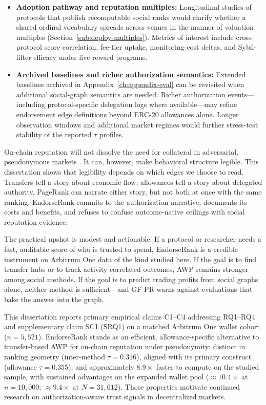 \begin{itemize}
\item \textbf{Adoption pathway and reputation multiples:} Longitudinal studies of protocols that publish recomputable social ranks would clarify whether a shared ordinal vocabulary spreads across venues in the manner of valuation multiples (Section~\ref{sub:deploy-multiples}). Metrics of interest include cross-protocol score correlation, fee-tier uptake, monitoring-cost deltas, and Sybil-filter efficacy under live reward programs.

\item \textbf{Archived baselines and richer authorization semantics:} Extended baselines archived in Appendix~\ref{ch:appendix-eval} can be revisited when additional social-graph semantics are needed. Richer authorization events---including protocol-specific delegation logs where available---may refine endorsement edge definitions beyond ERC-20 allowances alone. Longer observation windows and additional market regimes would further stress-test stability of the reported $\tau$ profiles.
\end{itemize}


On-chain reputation will not dissolve the need for collateral in adversarial, pseudonymous markets . It can, however, make behavioral structure legible. This dissertation shows that legibility depends on which edges we choose to read. Transfers tell a story about economic flow; allowances tell a story about delegated authority. PageRank can narrate either story, but not both at once with the same ranking. EndorseRank commits to the authorization narrative, documents its costs and benefits, and refuses to confuse outcome-native ceilings with social reputation evidence.

The practical upshot is modest and actionable. If a protocol or researcher needs a fast, auditable score of who is trusted to spend, EndorseRank is a credible instrument on Arbitrum One data of the kind studied here. If the goal is to find transfer hubs or to track activity-correlated outcomes, AWP remains stronger among social methods. If the goal is to predict trading profits from social graphs alone, neither method is sufficient---and GF-PR warns against evaluations that bake the answer into the graph.

This dissertation reports primary empirical claims C1--C4 addressing RQ1--RQ4 and supplementary claim SC1 (SRQ1) on a matched Arbitrum One wallet cohort ($n=5{,}521$). EndorseRank stands as an efficient, allowance-specific alternative to transfer-based AWP for on-chain reputation under pseudonymity: distinct in ranking geometry (inter-method $\tau=0.316$), aligned with its primary construct (allowance $\tau=0.355$), and approximately $8.9\times$ faster to compute on the studied sample, with sustained advantages on the expanded wallet pool ($\approx 10.4\times$ at $n=10{,}000$; $\approx 9.4\times$ at $N=31{,}612$). Those properties motivate continued research on authorization-aware trust signals in decentralized markets.
